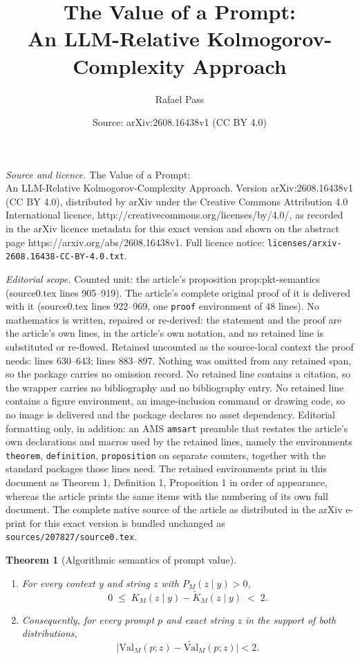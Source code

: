 \documentclass[10pt,a4paper]{amsart}
\title{The Value of a Prompt:\\ An LLM-Relative Kolmogorov-Complexity Approach}
\author{Rafael Pass}
\date{Source: arXiv:2608.16438v1 (CC BY 4.0)}
\newtheorem{theorem}{Theorem}
\newcommand{\Val}{\mathrm{Val}}
\begin{document}
\maketitle

\noindent\emph{Source and licence.} The Value of a Prompt:\\ An LLM-Relative Kolmogorov-Complexity Approach. Version arXiv:2608.16438v1 (CC BY 4.0), distributed by arXiv under the Creative Commons Attribution 4.0 International licence, http://creativecommons.org/licenses/by/4.0/, as recorded in the arXiv licence metadata for this exact version and shown on the abstract page https://arxiv.org/abs/2608.16438v1. Full licence notice: \texttt{licenses/arxiv-2608.16438-CC-BY-4.0.txt}.\par\smallskip

\noindent\textit{Editorial scope.} Counted unit: the article's proposition prop:pkt-semantics (source0.tex lines 905--919). The article's complete original proof of it is delivered with it (source0.tex lines 922--969, one \texttt{proof} environment of 48 lines). No mathematics is written, repaired or re-derived: the statement and the proof are the article's own lines, in the article's own notation, and no retained line is substituted or re-flowed.  Retained uncounted as the source-local context the proof needs: lines 630--643; lines 883--897.  Nothing was omitted from any retained span, so the package carries no omission record.  No retained line contains a citation, so the wrapper carries no bibliography and no bibliography entry.  No retained line contains a figure environment, an image-inclusion command or drawing code, so no image is delivered and the package declares no asset dependency.  Editorial formatting only, in addition: an AMS \texttt{amsart} preamble that restates the article's own declarations and macros used by the retained lines, namely the environments \texttt{theorem}, \texttt{definition}, \texttt{proposition} on separate counters, together with the standard packages those lines need.  The retained environments print in this document as Theorem 1, Definition 1, Proposition 1 in order of appearance, whereas the article prints the same items with the numbering of its own full document.  The complete native source of the article as distributed in the arXiv e-print for this exact version is bundled unchanged as \texttt{sources/207827/source0.tex}.
\begin{theorem}[Algorithmic semantics of prompt value]\label{thm:semantics}
\leavevmode
\begin{enumerate}
\item[(i)] For every context $y$ and string $z$ with $P_M(z \mid y) > 0$,
\begin{equation}\label{eq:codinggap}
0 \;\le\; K_M(z \mid y) - \widetilde{K}_M(z \mid y) \;<\; 2.
\end{equation}
\item[(ii)] Consequently, for every prompt $p$ and exact string $z$ in the
support of both distributions,
\begin{equation}\label{eq:threebits}
\bigl| \Val_M(p;z) - \widetilde{\Val}_M(p;z) \bigr| < 2.
\end{equation}
\end{enumerate}
\end{theorem}
\end{document}
